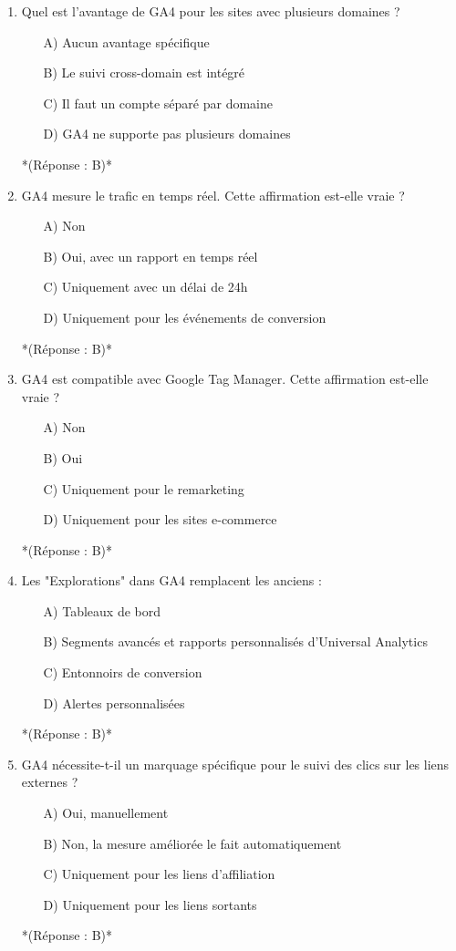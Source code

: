 \documentclass[12pt,a4paper,twoside]{report}
\begin{document}
\begin{enumerate}
    \item Quel est l'avantage de GA4 pour les sites avec plusieurs domaines ?
    \begin{itemize}
        \item[A)] Aucun avantage spécifique
        \item[B)] Le suivi cross-domain est intégré
        \item[C)] Il faut un compte séparé par domaine
        \item[D)] GA4 ne supporte pas plusieurs domaines
    \end{itemize}
    *(Réponse : B)*

    \item GA4 mesure le trafic en temps réel. Cette affirmation est-elle vraie ?
    \begin{itemize}
        \item[A)] Non
        \item[B)] Oui, avec un rapport en temps réel
        \item[C)] Uniquement avec un délai de 24h
        \item[D)] Uniquement pour les événements de conversion
    \end{itemize}
    *(Réponse : B)*

    \item GA4 est compatible avec Google Tag Manager. Cette affirmation est-elle vraie ?
    \begin{itemize}
        \item[A)] Non
        \item[B)] Oui
        \item[C)] Uniquement pour le remarketing
        \item[D)] Uniquement pour les sites e-commerce
    \end{itemize}
    *(Réponse : B)*

    \item Les "Explorations" dans GA4 remplacent les anciens :
    \begin{itemize}
        \item[A)] Tableaux de bord
        \item[B)] Segments avancés et rapports personnalisés d'Universal Analytics
        \item[C)] Entonnoirs de conversion
        \item[D)] Alertes personnalisées
    \end{itemize}
    *(Réponse : B)*

    \item GA4 nécessite-t-il un marquage spécifique pour le suivi des clics sur les liens externes ?
    \begin{itemize}
        \item[A)] Oui, manuellement
        \item[B)] Non, la mesure améliorée le fait automatiquement
        \item[C)] Uniquement pour les liens d'affiliation
        \item[D)] Uniquement pour les liens sortants
    \end{itemize}
    *(Réponse : B)*


\end{enumerate}
\end{document}
